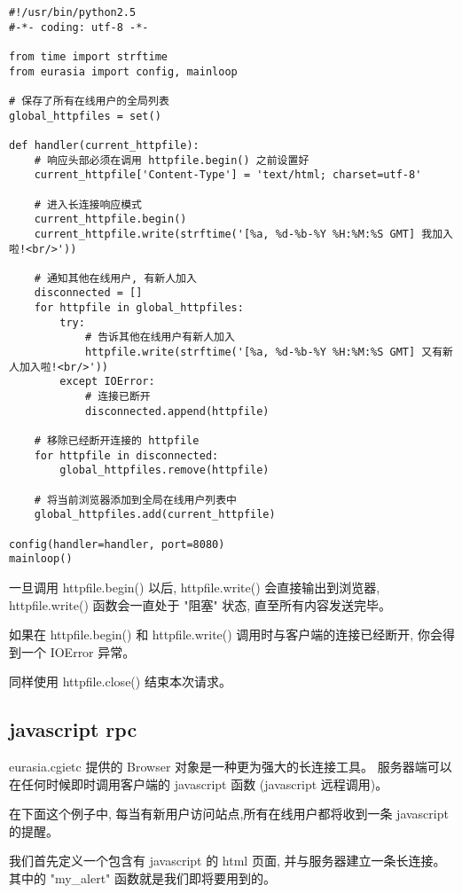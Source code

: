 \documentclass{manual}
\begin{document}
\begin{verbatim}
#!/usr/bin/python2.5
#-*- coding: utf-8 -*-

from time import strftime
from eurasia import config, mainloop

# 保存了所有在线用户的全局列表
global_httpfiles = set()

def handler(current_httpfile):
	# 响应头部必须在调用 httpfile.begin() 之前设置好
	current_httpfile['Content-Type'] = 'text/html; charset=utf-8'

	# 进入长连接响应模式
	current_httpfile.begin()
	current_httpfile.write(strftime('[%a, %d-%b-%Y %H:%M:%S GMT] 我加入啦!<br/>'))

	# 通知其他在线用户, 有新人加入
	disconnected = []
	for httpfile in global_httpfiles:
		try:
			# 告诉其他在线用户有新人加入
			httpfile.write(strftime('[%a, %d-%b-%Y %H:%M:%S GMT] 又有新人加入啦!<br/>'))
		except IOError:
			# 连接已断开
			disconnected.append(httpfile)

	# 移除已经断开连接的 httpfile
	for httpfile in disconnected:
		global_httpfiles.remove(httpfile)

	# 将当前浏览器添加到全局在线用户列表中
	global_httpfiles.add(current_httpfile)

config(handler=handler, port=8080)
mainloop()
\end{verbatim}

一旦调用 httpfile.begin() 以后, httpfile.write() 会直接输出到浏览器,
httpfile.write() 函数会一直处于 "阻塞" 状态, 直至所有内容发送完毕。

如果在 httpfile.begin() 和 httpfile.write() 调用时与客户端的连接已经断开,
你会得到一个 IOError 异常。

同样使用 httpfile.close() 结束本次请求。


\subsection{javascript rpc}

eurasia.cgietc 提供的 Browser 对象是一种更为强大的长连接工具。
服务器端可以在任何时候即时调用客户端的 javascript 函数 (javascript 远程调用)。

在下面这个例子中, 每当有新用户访问站点,所有在线用户都将收到一条 javascript 的提醒。

我们首先定义一个包含有 javascript 的 html 页面, 并与服务器建立一条长连接。
其中的 "my_alert" 函数就是我们即将要用到的。
\end{document}
